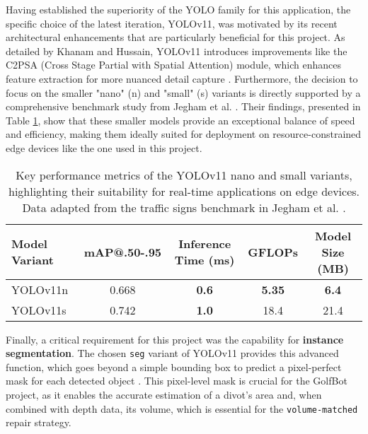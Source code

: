 Having established the superiority of the YOLO family for this application, the specific choice of the latest iteration, YOLOv11, was motivated by its recent architectural enhancements that are particularly beneficial for this project. As detailed by Khanam and Hussain, YOLOv11 introduces improvements like the C2PSA (Cross Stage Partial with Spatial Attention) module, which enhances feature extraction for more nuanced detail capture \cite{khanam2024yolov11_overview}. Furthermore, the decision to focus on the smaller "nano" (n) and "small" (s) variants is directly supported by a comprehensive benchmark study from Jegham et al. \cite{jegham2024evaluating}. Their findings, presented in Table \ref{tab:yolov11_performance}, show that these smaller models provide an exceptional balance of speed and efficiency, making them ideally suited for deployment on resource-constrained edge devices like the one used in this project.

\begin{table}[h!]
    \centering
    \caption[Performance of Selected YOLOv11 Variants for Edge Deployment.]
    {Key performance metrics of the YOLOv11 nano and small variants, highlighting their suitability for real-time applications on edge devices. Data adapted from the traffic signs benchmark in Jegham et al. \cite{jegham2024evaluating}.}
    \label{tab:yolov11_performance}
    \begin{tabular}{l c c c c}
        \hline
        \textbf{Model Variant} & \textbf{mAP@.50-.95} & \textbf{Inference Time (ms)} & \textbf{GFLOPs} & \textbf{Model Size (MB)} \\
        \hline
        YOLOv11n & 0.668 & \textbf{0.6} & \textbf{5.35} & \textbf{6.4} \\
        YOLOv11s & 0.742 & \textbf{1.0} & 18.4 & 21.4 \\
        \hline
    \end{tabular}
\end{table}

Finally, a critical requirement for this project was the capability for \textbf{instance segmentation}. The chosen \texttt{seg} variant of YOLOv11 provides this advanced function, which goes beyond a simple bounding box to predict a pixel-perfect mask for each detected object \cite{wu2019recent, sapkota2024comparing}. This pixel-level mask is crucial for the GolfBot project, as it enables the accurate estimation of a divot's area and, when combined with depth data, its volume, which is essential for the \texttt{volume-matched} repair strategy.

